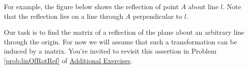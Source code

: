 \documentclass{ximera}
\begin{document}
For example, the figure below shows the reflection of point $A$ about line $l$.  Note that the reflection lies on a line through $A$ perpendicular to $l$.

\begin{center}
    \end{center}
 
Our task is to find the matrix of a reflection of the plane about an arbitrary line through the origin.  For now we will assume that such a transformation can be induced by a matrix.  You're invited to revisit this assertion in Problem \ref{prob:linOfRotRef} of \href{https://ximera.osu.edu/oerlinalg/LinearAlgebra/SUPX-0060/main}{Additional Exercises}.
  
\end{document}
